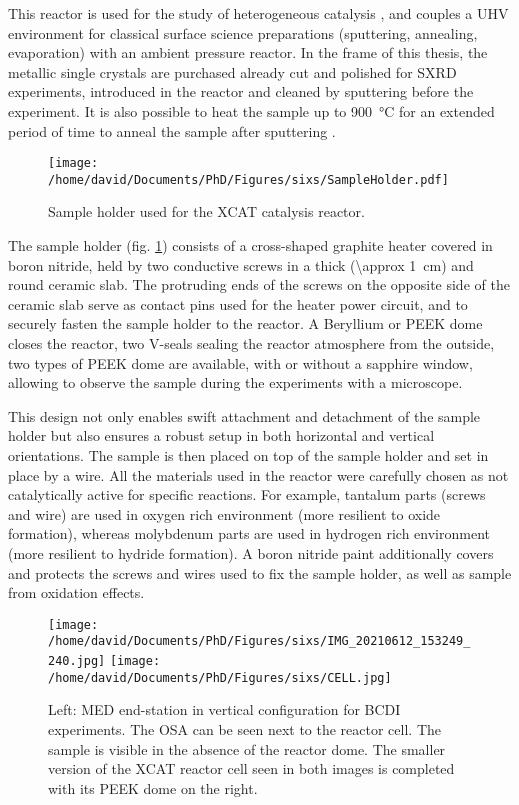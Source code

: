This reactor is used for the study of heterogeneous catalysis \parencite{VanRijn2010, Resta2020a}, and couples a UHV environment for classical surface science preparations (sputtering, annealing, evaporation) with an ambient pressure reactor.
In the frame of this thesis, the metallic single crystals are purchased already cut and polished for SXRD experiments, introduced in the reactor and cleaned by sputtering \parencite{Taglauer1990} before the experiment.
It is also possible to heat the sample up to \qty{900}{\degreeCelsius} for an extended period of time to anneal the sample after sputtering \parencite{Musket1982}.

\begin{figure}[!htb]
    \centering
    \texttt{[image: /home/david/Documents/PhD/Figures/sixs/SampleHolder.pdf]}
    \caption{
        Sample holder used for the XCAT catalysis reactor.
    }
    \label{fig:SampleHolder}
\end{figure}

The sample holder (fig. \ref{fig:SampleHolder}) consists of a cross-shaped graphite heater covered in boron nitride, held by two conductive screws in a thick (\qty{\approx 1}{\cm}) and round ceramic slab.
The protruding ends of the screws on the opposite side of the ceramic slab serve as contact pins used for the heater power circuit, and to securely fasten the sample holder to the reactor.
A Beryllium or PEEK dome closes the reactor, two V-seals sealing the reactor atmosphere from the outside, two types of PEEK dome are available, with or without a sapphire window, allowing to observe the sample during the experiments with a microscope.

This design not only enables swift attachment and detachment of the sample holder but also ensures a robust setup in both horizontal and vertical orientations.
The sample is then placed on top of the sample holder and set in place by a wire.
All the materials used in the reactor were carefully chosen as not catalytically active for specific reactions.
For example, tantalum parts (screws and wire) are used in oxygen rich environment (more resilient to oxide formation), whereas molybdenum parts are used in hydrogen rich environment (more resilient to hydride formation).
A boron nitride paint additionally covers and protects the screws and wires used to fix the sample holder, as well as sample from oxidation effects.

\begin{figure}[!htb]
    \centering
    \texttt{[image: /home/david/Documents/PhD/Figures/sixs/IMG\_20210612\_153249\_240.jpg]}
    \texttt{[image: /home/david/Documents/PhD/Figures/sixs/CELL.jpg]}
    \caption{
        Left: MED end-station in vertical configuration for BCDI experiments.
        The OSA can be seen next to the reactor cell.
        The sample is visible in the absence of the reactor dome.
        The smaller version of the XCAT reactor cell seen in both images is completed with its PEEK dome on the right.
    }
    \label{fig:MEDV}
\end{figure}

